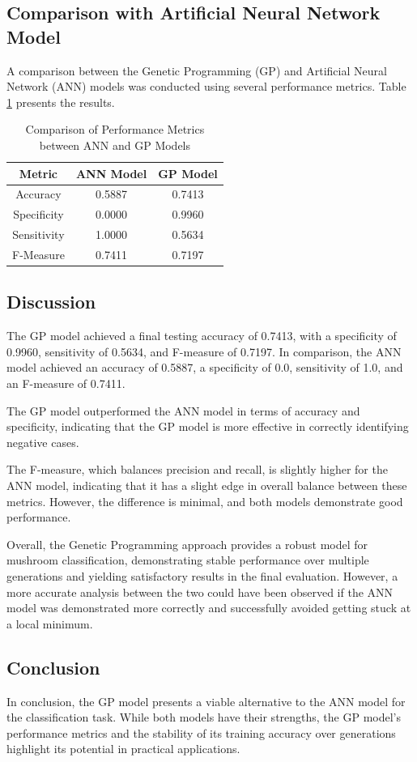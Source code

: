 \documentclass{article}
\begin{document}
\subsection{Comparison with Artificial Neural Network Model}
A comparison between the Genetic Programming (GP) and Artificial Neural Network (ANN) models was conducted using several performance metrics. Table \ref{tab:comparison} presents the results.

\begin{table}[h!]
    \centering
    \label{tab:comparison}
    \begin{tabular}{|c|c|c|}
        \hline
        \textbf{Metric} & \textbf{ANN Model} & \textbf{GP Model} \\
        \hline
        Accuracy & 0.5887 & 0.7413 \\
        Specificity & 0.0000 & 0.9960 \\
        Sensitivity & 1.0000 & 0.5634 \\
        F-Measure & 0.7411 & 0.7197 \\
        \hline
    \end{tabular}
    \caption{Comparison of Performance Metrics between ANN and GP Models}
\end{table}

\subsection{Discussion}
The GP model achieved a final testing accuracy of 0.7413, with a specificity of 0.9960, sensitivity of 0.5634, and F-measure of 0.7197. In comparison, the ANN model achieved an accuracy of 0.5887, a specificity of 0.0, sensitivity of 1.0, and an F-measure of 0.7411.

The GP model outperformed the ANN model in terms of accuracy and specificity, indicating that the GP model is more effective in correctly identifying negative cases. 

The F-measure, which balances precision and recall, is slightly higher for the ANN model, indicating that it has a slight edge in overall balance between these metrics. However, the difference is minimal, and both models demonstrate good performance.

Overall, the Genetic Programming approach provides a robust model for mushroom classification, demonstrating stable performance over multiple generations and yielding satisfactory results in the final evaluation. However, a more accurate analysis between the two could have been observed if the ANN model was demonstrated more correctly and successfully avoided getting stuck at a local minimum.

\subsection{Conclusion}
In conclusion, the GP model presents a viable alternative to the ANN model for the classification task. While both models have their strengths, the GP model's performance metrics and the stability of its training accuracy over generations highlight its potential in practical applications.
\end{document}
